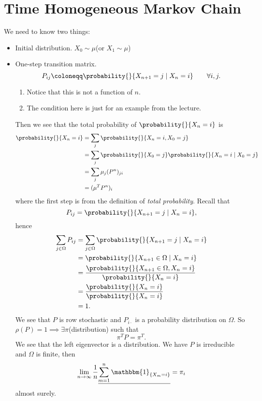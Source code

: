 \section{Time Homogeneous Markov Chain}
We need to know two things:
\begin{itemize}
	\item Initial distribution. \(X_0 \sim \mu\)(or \(X_1\sim \mu\))
	\item One-step transition matrix.
	      \[
		      P_{ij} \coloneqq \probability{}{X_{n+1} = j \mid X_n = i}\qquad \forall i, j.
	      \]


	      \begin{note}
		      \begin{enumerate}
			      \item Notice that this is not a function of \(n\).
			      \item The condition here is just for an example from the lecture.
		      \end{enumerate}
	      \end{note}

	      Then we see that the total probability of \(\probability{}{X_n = i}\) is
	      \[
		      \begin{split}
			      \probability{}{X_n = i} &= \sum_j \probability{}{X_n = i, X_0 = j}\\
			      &= \sum_j \probability{}{X_0 = j}\probability{}{X_n = i  \mid  X_0 = j}\\
			      &=\sum_j \mu_{j} (P^n)_{ji}\\
			      &= (\mu^{T} P^n)_i
		      \end{split}
	      \]
	      where the first step is from the definition of \emph{total probability}. Recall that
	      \[
		      P_{ij} = \probability{}{X_{n+1} = j \mid X_n = i},
	      \]
	      hence
	      \[
		      \begin{split}
			      \sum_{j\in \Omega} P_{ij} &= \sum_{j\in \Omega} \probability{}{X_{n+1} = j \mid X_n = i}\\
			      &= \probability{}{X_{n+1}\in \Omega \mid X_n = i}\\
			      &= \frac{\probability{}{X_{n+1}\in \Omega, X_n = i} }{\probability{}{X_n = i} }\\
			      &= \frac{\probability{}{X_n = i} }{\probability{}{X_n = i} }\\
			      &= 1.
		      \end{split}
	      \]
	      We see that \(P\) is row stochastic and \(P_{i\cdot}\) is a probability distribution on \(\Omega\). So \(\rho(P) = 1\implies \exists  \pi\)(distribution) such that
	      \[
		      \pi^{T} P = \pi^{T}.
	      \]
	      We see that the left eigenvector is a distribution. We have \(P\) is irreducible and \(\Omega\) is finite, then
	      \[
		      \lim_{n\to \infty } \frac{1}{n}\underline{\sum\limits_{m=1}^{n}  \mathbbm{1}_{\left\{ X_m = i \right\} }} = \pi_i
	      \]
	      almost surely.
\end{itemize}

